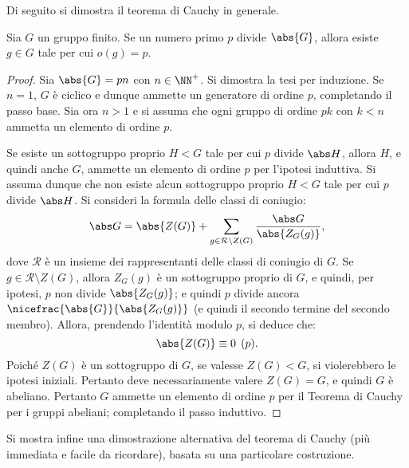 \documentclass[12pt]{scrartcl}
\begin{document}
	Di seguito si dimostra il teorema di Cauchy in generale.
	
	\begin{theorem}[di Cauchy]
		Sia $G$ un gruppo finito. Se un numero primo $p$ divide $\abs{G}$, allora
		esiste $g \in G$ tale per cui $o(g) = p$.
	\end{theorem}
	
	\begin{proof}
		Sia $\abs{G} = pn$ con $n \in \NN^+$. Si dimostra la tesi per induzione.
		Se $n = 1$, $G$ è ciclico e dunque ammette un generatore di ordine $p$,
		completando il passo base. Sia ora $n > 1$ e si assuma che ogni gruppo di ordine $pk$ con
		$k < n$ ammetta un elemento di ordine $p$. \medskip
		
		
		Se esiste un sottogruppo proprio $H < G$ tale per cui $p$ divide $\abs H$, allora $H$, e quindi
		anche $G$, ammette un elemento di ordine $p$ per l'ipotesi induttiva.
		Si assuma dunque che non esiste alcun sottogruppo proprio $H < G$ tale
		per cui $p$ divide $\abs H$. Si consideri la formula delle classi
		di coniugio:
		\[ \abs G = \abs{Z(G)} + \sum_{g \in \mathcal{R} \setminus Z(G)} \frac{\abs G}{\abs{Z_G(g)}}, \]
		dove $\mathcal{R}$ è un insieme dei rappresentanti delle classi di coniugio
		di $G$. Se $g \in \mathcal{R} \setminus Z(G)$, allora $Z_G(g)$ è un sottogruppo
		proprio di $G$, e quindi, per ipotesi, $p$ non divide $\abs{Z_G(g)}$; e quindi
		$p$ divide ancora $\nicefrac{\abs{G}}{\abs{Z_G(g)}}$ (e quindi il secondo termine
		del secondo membro). Allora, prendendo
		l'identità modulo $p$, si deduce che:
		\[ \abs{Z(G)} \equiv 0 \pod p. \]		
		Poiché $Z(G)$ è un sottogruppo di $G$, se valesse $Z(G) < G$, si violerebbero
		le ipotesi iniziali. Pertanto deve necessariamente valere $Z(G) = G$, e quindi
		$G$ è abeliano. Pertanto $G$ ammette un elemento di ordine $p$ per il Teorema
		di Cauchy per i gruppi abeliani; completando il passo induttivo.
	\end{proof} \smallskip
	
	
	Si mostra infine una dimostrazione alternativa del teorema di Cauchy (più immediata
	e facile da ricordare), basata su una particolare costruzione.
	
\end{document}
